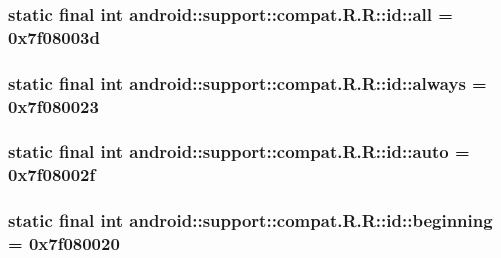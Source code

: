 \hypertarget{classandroid_1_1support_1_1compat_1_1_r_1_1id_361e520d93686d3d4e5dd7507b5754b7}{
\subsubsection[{all}]{\setlength{\rightskip}{0pt plus 5cm}static final int android::support::compat.R.R::id::all = 0x7f08003d}}
\label{classandroid_1_1support_1_1compat_1_1_r_1_1id_361e520d93686d3d4e5dd7507b5754b7}


\hypertarget{classandroid_1_1support_1_1compat_1_1_r_1_1id_911e4bae8ca999f7e64b5fccebfc8369}{
\subsubsection[{always}]{\setlength{\rightskip}{0pt plus 5cm}static final int android::support::compat.R.R::id::always = 0x7f080023}}
\label{classandroid_1_1support_1_1compat_1_1_r_1_1id_911e4bae8ca999f7e64b5fccebfc8369}


\hypertarget{classandroid_1_1support_1_1compat_1_1_r_1_1id_e162fb08f0fbb7bb3a33d3d9d729c909}{
\subsubsection[{auto}]{\setlength{\rightskip}{0pt plus 5cm}static final int android::support::compat.R.R::id::auto = 0x7f08002f}}
\label{classandroid_1_1support_1_1compat_1_1_r_1_1id_e162fb08f0fbb7bb3a33d3d9d729c909}


\hypertarget{classandroid_1_1support_1_1compat_1_1_r_1_1id_5b200062e8fe230f08b1d72eb6bdc991}{
\subsubsection[{beginning}]{\setlength{\rightskip}{0pt plus 5cm}static final int android::support::compat.R.R::id::beginning = 0x7f080020}}
\label{classandroid_1_1support_1_1compat_1_1_r_1_1id_5b200062e8fe230f08b1d72eb6bdc991}


